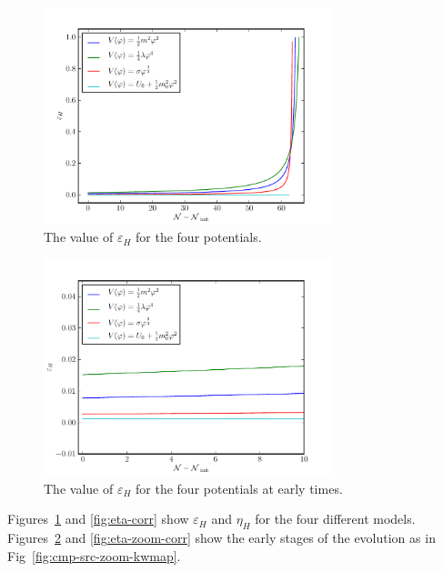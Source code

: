 \begin{figure}
 \centering
 \includegraphics[width=0.75\textwidth]{numerical/graphs/epsilon_slowroll-large.pdf}
 \caption{The value of $\varepsilon_H$ for the four potentials.}
 \label{fig:eps-corr}
\end{figure}

\begin{figure}
 \centering
 \includegraphics[width=0.75\textwidth]{numerical/graphs/epsilon_slowroll_zoom-large.pdf}
 \caption{The value of $\varepsilon_H$ for the four potentials at early times.}
 \label{fig:eps-zoom-corr}
\end{figure}

Figures~\ref{fig:eps-corr} and \ref{fig:eta-corr} show $\varepsilon_H$ and $\eta_H$ for the
four different models. Figures~\ref{fig:eps-zoom-corr} and
\ref{fig:eta-zoom-corr} show the early stages of the evolution as in
Fig~\ref{fig:cmp-src-zoom-kwmap}.

